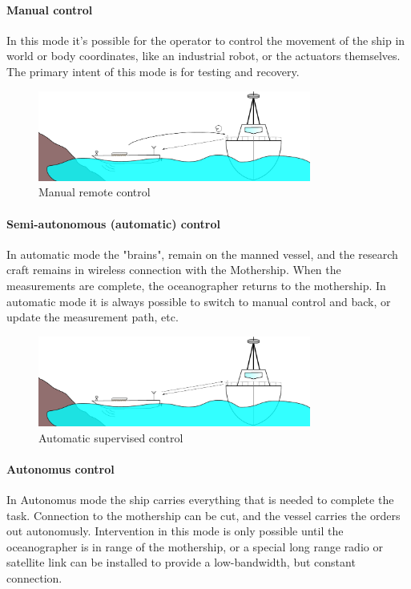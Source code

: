 \paragraph{Manual control}
In this mode it's possible for the operator to control the movement of the ship in world or body coordinates, like an industrial robot, or the actuators themselves. The primary intent of this mode is for testing and recovery.

\begin{figure}[H]
	\centering
	\includegraphics[width=0.8\textwidth]{img/manualcontrol}
	\caption{Manual remote control}
	\label{fig:manualcontrol}
\end{figure}

\paragraph{Semi-autonomous (automatic) control}
In automatic mode the "brains", remain on the manned vessel, and the research craft remains in wireless connection with the Mothership. When the measurements are complete, the oceanographer returns to the mothership. In automatic mode it is always possible to switch to manual control and back, or update the measurement path, etc.

\begin{figure}[H]
	\centering
	\includegraphics[width=0.8\textwidth]{img/automatic}
	\caption{Automatic supervised control}
	\label{fig:automatic}
\end{figure}

\paragraph{Autonomus control}
In Autonomus mode the ship carries everything that is needed to complete the task. Connection to the mothership can be cut, and the vessel carries the orders out autonomusly. Intervention in this mode is only possible until the oceanographer is in range of the mothership, or a special long range radio or satellite link can be installed to provide a low-bandwidth, but constant connection.

